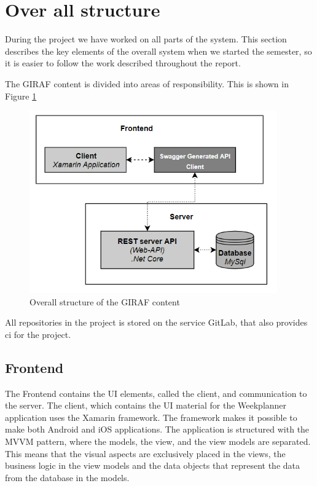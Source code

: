 \section{Over all structure}

During the project we have worked on all parts of the system. This section describes the key elements of the overall system when we started the semester, so it is easier to follow the work described throughout the report. 

The GIRAF content is divided into areas of responsibility. This is shown in Figure \ref{fig:ProductStructure}

\begin{figure}[H]
    \begin{center}
        \includegraphics[width=0.95\textwidth]{figures/ProductStructure.png}
    \end{center}
    \caption{Overall structure of the GIRAF content}
    \label{fig:ProductStructure}
\end{figure}

All repositories in the project is stored on the service GitLab, that also provides \gls{ci} for the project. 

\subsection{Frontend}
The Frontend contains the UI elements, called the client, and communication to the server. The client, which contains the UI material for the Weekplanner application uses the Xamarin framework. The framework makes it possible to make both Android and iOS applications. The application is structured with the MVVM pattern, where the models, the view, and the view models are separated. This means that the visual aspects are exclusively placed in the views, the business logic in the view models and the data objects that represent the data from the database in the models.


